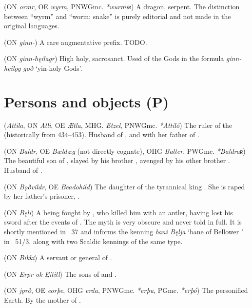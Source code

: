 \begin{itemize}
 (ON \emph{ormr}, OE \emph{wyrm}, PNWGmc. \emph{*wurmiʀ})
  A dragon, serpent.  The distinction between “wyrm” and “worm; snake” is purely editorial and not made in the original languages.

 (ON \emph{ginn-})
  A rare augmentative prefix. TODO.

 (ON \emph{ginn-hęilagr})
  High holy, sacrosanct.  Used of the Gods in the formula \emph{ginn-hęilǫg goð} ‘yin-holy Gods’.

\end{itemize}

\section{Persons and objects (P)}
\begin{itemize}

 (\emph{Attila}, ON \emph{Atli}, OE \emph{Ætla}, MHG. \emph{Etzel}, PNWGmc. \emph{*Attiló})
  The ruler of the  (historically from 434–453). Husband of , and with her father of .

 (ON \emph{Baldr}, OE \emph{Bældæg} (not directly cognate), OHG \emph{Balter}, PWGmc. \emph{*Baldraʀ})
  The beautiful son of , slayed by his brother , avenged by his other brother .  Husband of .

 (ON \emph{Bǫðvildr}, OE \emph{Beadohild})
  The daughter of the tyrannical king .  She is raped by her father’s prisoner, .

 (ON \emph{Bęli})
  A being fought by , who killed him with an antler, having lost his sword after the events of \Skirnismal.  The myth is very obscure and never told in full.  It is shortly mentioned in \Gylfaginning\ 37 and informs the kenning \emph{bani Bęlja} ‘bane of Bellower ’ in \Voluspa\ 51/3, along with two Scaldic kennings of the same type.

 (ON \emph{Bikki})
  A servant or general of .

 (ON \emph{Erpr ok Ęitill})
  The sons of  and .

 (ON \emph{jǫrð}, OE \emph{eorþe}, OHG \emph{erda}, PNWGmc. \emph{*erþu}, PGmc. \emph{*erþó})
  The personified Earth.  By  the mother of .


\end{itemize}
